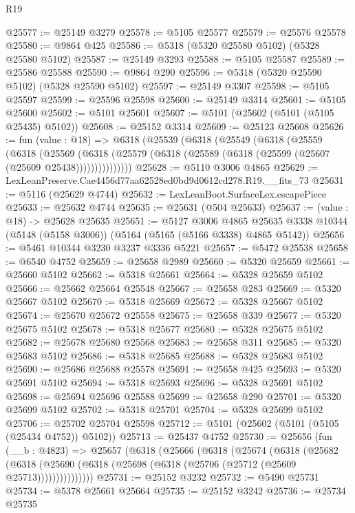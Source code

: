\begin{lexlean}{R19}
\begin{coremodule}
{{{{{{{{{{{@25577 := @25149 @3279
@25578 := @5105 @25577
@25579 := @25576 @25578
@25580 := @9864 @425
@25586 := @5318 (@5320 @25580 @5102) (@5328 @25580 @5102)
@25587 := @25149 @3293
@25588 := @5105 @25587
@25589 := @25586 @25588
@25590 := @9864 @290
@25596 := @5318 (@5320 @25590 @5102) (@5328 @25590 @5102)
@25597 := @25149 @3307
@25598 := @5105 @25597
@25599 := @25596 @25598
@25600 := @25149 @3314
@25601 := @5105 @25600
@25602 := @5101 @25601
@25607 := @5101 (@25602 (@5101 (@5105 @25435) @5102))
@25608 := @25152 @3314
@25609 := @25123 @25608
@25626 := fun (value : @18) =>
  @6318
    (@25539
      (@6318
        (@25549
          (@6318
            (@25559
              (@6318
                (@25569
                  (@6318 (@25579 (@6318 (@25589 (@6318 (@25599 (@25607 (@25609 @25438)))))))))))))))
@25628 := @5110 @3006 @4865
@25629 := LexLeanPreserve.Cae4456d77aa62528ed0bd9d0612cd278.R19.__fits_73
@25631 := @5116 (@25629 @4744)
@25632 := LexLeanBoot.SurfaceLex.escapePiece
@25633 := @25632 @4744
@25635 := @25631 (@504 @25633)
@25637 := (value : @18) -> @25628 @25635
@25651 := @5127
    @3006
    @4865
    @25635
    @3338
    @10344
    (@5148 (@5158 @3006))
    (@5164 (@5165 (@5166 @3338) @4865 @5142))
@25656 := @5461 @10344 @3230 @3237 @3336 @5221
@25657 := @5472 @25538
@25658 := @6540 @4752
@25659 := @25658 @2989
@25660 := @5320 @25659
@25661 := @25660 @5102
@25662 := @5318 @25661
@25664 := @5328 @25659 @5102
@25666 := @25662 @25664 @25548
@25667 := @25658 @283
@25669 := @5320 @25667 @5102
@25670 := @5318 @25669
@25672 := @5328 @25667 @5102
@25674 := @25670 @25672 @25558
@25675 := @25658 @339
@25677 := @5320 @25675 @5102
@25678 := @5318 @25677
@25680 := @5328 @25675 @5102
@25682 := @25678 @25680 @25568
@25683 := @25658 @311
@25685 := @5320 @25683 @5102
@25686 := @5318 @25685
@25688 := @5328 @25683 @5102
@25690 := @25686 @25688 @25578
@25691 := @25658 @425
@25693 := @5320 @25691 @5102
@25694 := @5318 @25693
@25696 := @5328 @25691 @5102
@25698 := @25694 @25696 @25588
@25699 := @25658 @290
@25701 := @5320 @25699 @5102
@25702 := @5318 @25701
@25704 := @5328 @25699 @5102
@25706 := @25702 @25704 @25598
@25712 := @5101 (@25602 (@5101 (@5105 (@25434 @4752)) @5102))
@25713 := @25437 @4752
@25730 := @25656
    (fun (__b : @4823) =>
    @25657
      (@6318
        (@25666
          (@6318
            (@25674
              (@6318
                (@25682
                  (@6318 (@25690 (@6318 (@25698 (@6318 (@25706 (@25712 (@25609 @25713)))))))))))))))
@25731 := @25152 @3232
@25732 := @5490 @25731
@25734 := @5378 @25661 @25664
@25735 := @25152 @3242
@25736 := @25734 @25735
}}}}}}}}}}}
\end{coremodule}
\end{lexlean}
